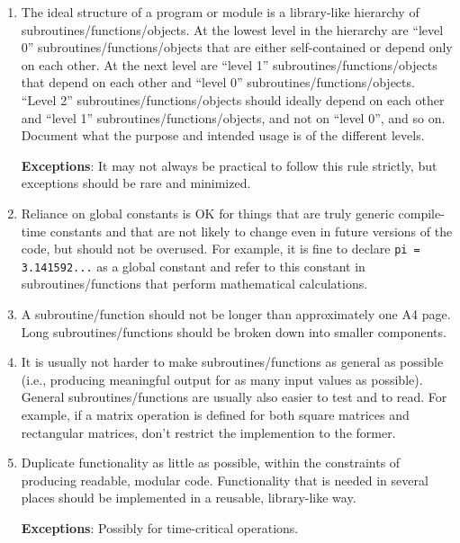\documentclass[preprint,aps]{revtex4}
\newcommand \progexception[1] {{\bf Exceptions}: {#1}}
\begin{document}
\begin{enumerate}
\item The ideal structure of a program or module is a library-like
    hierarchy of subroutines/functions/objects. At the lowest level in
    the hierarchy are ``level 0'' subroutines/functions/objects that
    are either self-contained or depend only on each other. At the
    next level are ``level 1'' subroutines/functions/objects that
    depend on each other and ``level 0''
    subroutines/functions/objects. ``Level 2''
    subroutines/functions/objects should ideally depend on each other
    and ``level 1'' subroutines/functions/objects, and not on ``level
    0'', and so on. Document what the purpose and intended usage is of
    the different levels.

    \progexception{It may not always be practical to follow this rule
    strictly, but exceptions should be rare and minimized.}
\item Reliance on global constants is OK for things that are truly
    generic compile-time constants and that are not likely to change
    even in future versions of the code, but should not be
    overused. For example, it is fine to declare \texttt{pi =
    3.141592...} as a global constant and refer to this constant in
    subroutines/functions that perform mathematical calculations.
\item A subroutine/function should not be longer than approximately one
    A4 page. Long subroutines/functions should be broken down into
    smaller components.
\item It is usually not harder to make subroutines/functions as general
    as possible (i.e., producing meaningful output for as many input
    values as possible). General subroutines/functions are usually
    also easier to test and to read. For example, if a matrix
    operation is defined for both square matrices and rectangular
    matrices, don't restrict the implemention to the former.
\item Duplicate functionality as little as possible, within the
    constraints of producing readable, modular code. Functionality
    that is needed in several places should be implemented in a
    reusable, library-like way.

    \progexception{Possibly for time-critical operations.}
\end{enumerate}
\end{document}
